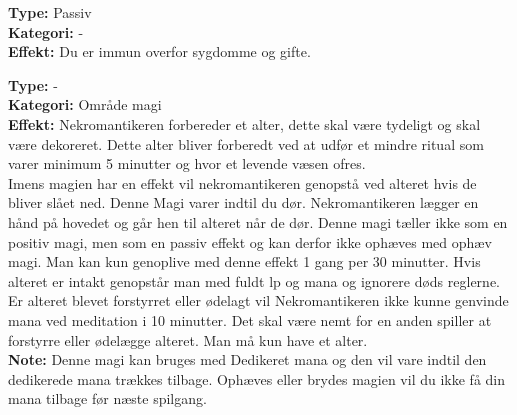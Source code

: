 \begin{død*}
\textbf{Type:} Passiv\\
\textbf{Kategori:} -\\
\textbf{Effekt:} Du er immun overfor sygdomme og gifte.
\end{død*}

\begin{død*}
\textbf{Type:} - \\
\textbf{Kategori:} Område magi\\
\textbf{Effekt:} Nekromantikeren forbereder et alter, dette skal være tydeligt og skal være dekoreret. Dette alter bliver forberedt ved at udfør et mindre ritual som varer minimum 5 minutter og hvor et levende væsen ofres.\\ 
Imens magien har en effekt vil nekromantikeren genopstå  ved alteret hvis de bliver slået ned. Denne Magi varer indtil du dør. Nekromantikeren lægger en hånd på hovedet og går hen til alteret når de dør. Denne magi tæller ikke som en positiv magi, men som en passiv effekt og kan derfor ikke ophæves med ophæv magi.  Man kan kun genoplive med denne effekt 1 gang per 30 minutter. Hvis alteret er intakt genopstår man med fuldt lp og mana og ignorere døds reglerne. Er alteret blevet forstyrret eller ødelagt vil Nekromantikeren ikke kunne genvinde mana ved meditation i 10 minutter. Det skal være nemt for en anden spiller at forstyrre eller ødelægge alteret. Man må kun have et alter.\\
\textbf{Note:} Denne magi kan bruges med Dedikeret mana og den vil vare indtil den dedikerede mana trækkes tilbage. Ophæves eller brydes magien vil du ikke få din mana tilbage før næste spilgang.\\
\end{død*}